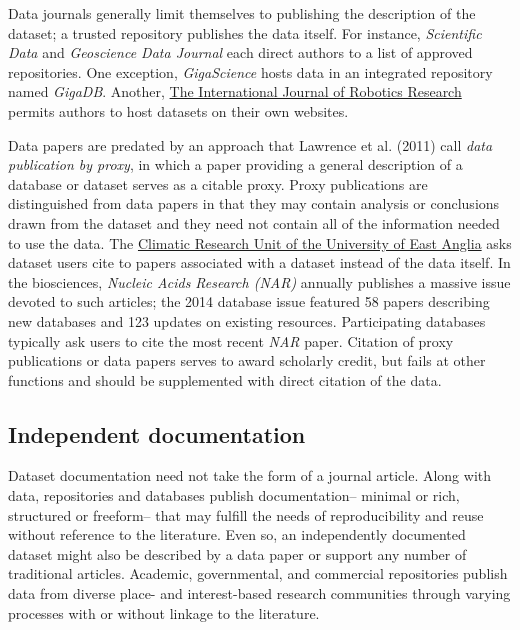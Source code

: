 \documentclass[10pt,a4paper,twocolumn]{article}
\begin{document}
{{Data journals generally limit themselves to publishing the description of the dataset; a trusted repository publishes the data itself.
For instance, \emph{Scientific Data} and \emph{Geoscience Data Journal} each direct authors to a list of approved repositories.
One exception, \emph{GigaScience} hosts data in an integrated repository named \emph{GigaDB}.
Another, \href{http://www.ijrr.org/}{The International Journal of Robotics Research}\cite{newman_data_2009} permits authors to host datasets on their own websites.

Data papers are predated by an approach that Lawrence et al. (2011) call \emph{data publication by proxy}, in which a paper providing a general description of a database or dataset serves as a citable proxy\cite{lawrence_data_2011}.
Proxy publications are distinguished from data papers in that they may contain analysis or conclusions drawn from the dataset and they need not contain all of the information needed to use the data.
The \href{http://www.cru.uea.ac.uk/}{Climatic Research Unit of the University of East Anglia} asks dataset users cite to papers associated with a dataset instead of the data itself.
In the biosciences, \emph{Nucleic Acids Research (NAR)} annually publishes a massive issue devoted to such articles; the 2014 database issue featured 58 papers describing new databases and 123 updates on existing resources\cite{fernandez-suarez_2014_2014}.
Participating databases typically ask users to cite the most recent \emph{NAR} paper.
Citation of proxy publications or data papers serves to award scholarly credit, but fails at other functions and should be supplemented with direct citation of the data.

\subsection*{Independent documentation}\label{independent-documentation}

Dataset documentation need not take the form of a journal article.
Along with data, repositories and databases publish documentation-- minimal or rich, structured or freeform-- that may fulfill the needs of reproducibility and reuse without reference to the literature.
Even so, an independently documented dataset might also be described by a data paper or support any number of traditional articles.
Academic, governmental, and commercial repositories publish data from diverse place- and interest-based research communities through varying processes with or without linkage to the literature.

}}
\end{document}
